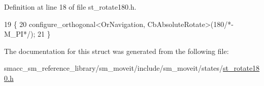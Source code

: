 Definition at line 18 of file st\+\_\+rotate180.\+h.


\begin{DoxyCode}
19     \{
20         configure\_orthogonal<OrNavigation, CbAbsoluteRotate>(180\textcolor{comment}{/*-M\_PI*/});
21     \}
\end{DoxyCode}


The documentation for this struct was generated from the following file\+:\begin{DoxyCompactItemize}
\item 
smacc\+\_\+sm\+\_\+reference\+\_\+library/sm\+\_\+moveit/include/sm\+\_\+moveit/states/\hyperlink{include_2sm__moveit_2states_2st__rotate180_8h}{st\+\_\+rotate180.\+h}\end{DoxyCompactItemize}
